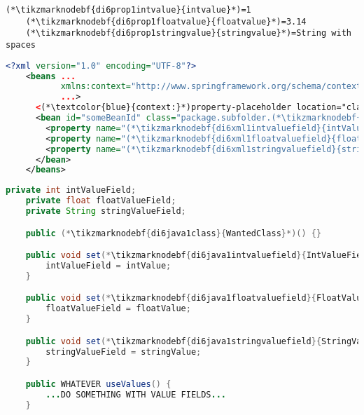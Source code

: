 \begin{lstlisting}[title={A \textit{.properties} file called \tikzmarknodebf{di6prop1filename}{\textit{setters.properties}}}]
    (*\tikzmarknodebf{di6prop1intvalue}{intvalue}*)=1
    (*\tikzmarknodebf{di6prop1floatvalue}{floatvalue}*)=3.14
    (*\tikzmarknodebf{di6prop1stringvalue}{stringvalue}*)=String with spaces
\end{lstlisting}
\begin{lstlisting}[language=XML, title={Configuration XML}]
    <?xml version="1.0" encoding="UTF-8"?>
    <beans ...
           xmlns:context="http://www.springframework.org/schema/context"
           ...>
      <(*\textcolor{blue}{context:}*)property-placeholder location="classpath:(*\tikzmarknodebf{di6xml1filename}{setter.properties}[ForestGreen]*)"/>
      <bean id="someBeanId" class="package.subfolder.(*\tikzmarknodebf{di6xml1class}{WantedClass}[ForestGreen]*)">
        <property name="(*\tikzmarknodebf{di6xml1intvaluefield}{intValueField}[ForestGreen]*)" value="(*\textcolor{ForestGreen}{\$\{}\tikzmarknodebf{di6xml1intvalue}{intvalue}[ForestGreen]\textcolor{ForestGreen}{\}}*)"/>
        <property name="(*\tikzmarknodebf{di6xml1floatvaluefield}{floatValueField}[ForestGreen]*)" value="(*\textcolor{ForestGreen}{\$\{}\tikzmarknodebf{di6xml1floatvalue}{floatvalue}[ForestGreen]\textcolor{ForestGreen}{\}}*)"/>
        <property name="(*\tikzmarknodebf{di6xml1stringvaluefield}{stringValueField}[ForestGreen]*)" value="(*\textcolor{ForestGreen}{\$\{}\tikzmarknodebf{di6xml1stringvalue}{stringvalue}[ForestGreen]\textcolor{ForestGreen}{\}}*)"/>
      </bean>
    </beans>
\end{lstlisting}
\begin{lstlisting}[language=Java, title={Wanted class with the zero--parameter constructor and setter methods}]
    private int intValueField;
    private float floatValueField;
    private String stringValueField;

    public (*\tikzmarknodebf{di6java1class}{WantedClass}*)() {}

    public void set(*\tikzmarknodebf{di6java1intvaluefield}{IntValueField}*)(int intValue) {
        intValueField = intValue;
    }

    public void set(*\tikzmarknodebf{di6java1floatvaluefield}{FloatValueField}*)(float floatValue) {
        floatValueField = floatValue;
    }

    public void set(*\tikzmarknodebf{di6java1stringvaluefield}{StringValueField}*)(string stringValue) {
        stringValueField = stringValue;
    }

    public WHATEVER useValues() {
        ...DO SOMETHING WITH VALUE FIELDS...
    }
\end{lstlisting}
